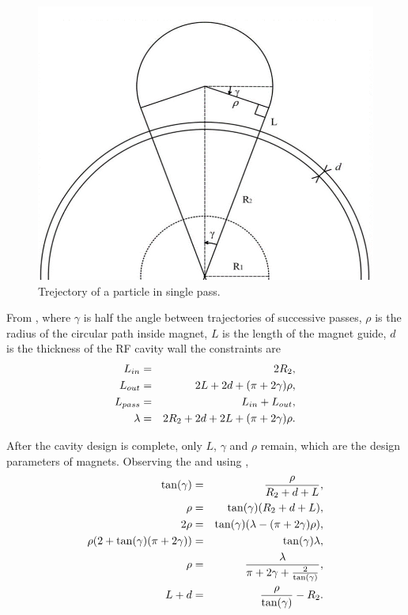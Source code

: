 \documentclass[a4paper,oneside,12pt]{report}
\numberwithin{equation}{chapter}
\begin{document}
\begin{figure}[H]    
    \centering
    \includegraphics[width=.7\linewidth]{./figures/design/magnet_design.png}
    \vspace{20pt}
    \caption{Trejectory of a particle in single pass.}
    \label{fig:magnet_design}
\end{figure}
\clearpage
From , where $\gamma$ is half the angle between trajectories of successive passes, $\rho$ is the radius of the circular path inside magnet, 
$L$ is the length of the magnet guide, $d$ is the thickness of the RF cavity wall the constraints are
\vspace{-10pt}\begin{eqnarray}
    L_{in} &=& 2R_2   , \\
    L_{out} &=& 2L + 2d + (\pi + 2\gamma)\rho  , \\
    L_{pass} &=& L_{in} + L_{out}  ,   \\
    \lambda &=& 2R_2 + 2d + 2L + (\pi + 2\gamma)\rho . \label{eq:magnet_lambda_constraint}
\vspace{-20pt}\end{eqnarray}

After the cavity design is complete, only $L$, $\gamma$ and $\rho$ remain, which are the design parameters of magnets.
Observing the  and using ,
\vspace{-10pt}\begin{eqnarray}
    \tan (\gamma) &=& \frac{\rho}{R_2 + d + L}  ,\\
    \rho &=&  \tan (\gamma) (R_2 + d + L)  , \\
    2\rho &=& \tan (\gamma) (\lambda - (\pi + 2\gamma)\rho)  , \\
    \rho (2 + \tan (\gamma)(\pi + 2\gamma)) &=&  \tan (\gamma) \lambda   ,\\
    \rho &=& \frac{\lambda}{\pi + 2\gamma + \frac{2}{\tan (\gamma)}}   ,\label{eq:magnet_rho_constraint} \\
    L + d &=& \frac{\rho}{\tan (\gamma)} - R_2 . \label{eq:magnet_L_constraint}
\vspace{-20pt}\end{eqnarray}
\end{document}
